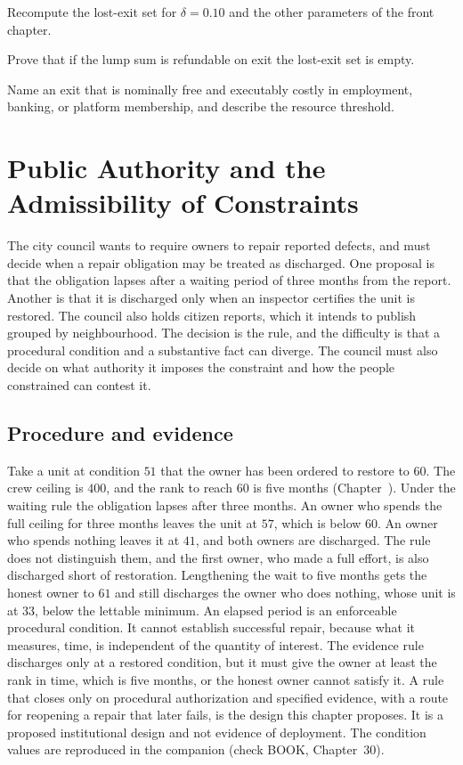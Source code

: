 \begin{exercise}
Recompute the lost-exit set for $\delta=0.10$ and the other parameters of the front chapter.
\end{exercise}
\begin{exercise}
Prove that if the lump sum is refundable on exit the lost-exit set is empty.
\end{exercise}
\begin{exercise}
Name an exit that is nominally free and executably costly in employment, banking, or platform membership, and describe the resource threshold.
\end{exercise}

\chapter{Public Authority and the Admissibility of Constraints}\label{ch:30}

The city council wants to require owners to repair reported defects, and must decide when a repair obligation may be treated as discharged. One proposal is that the obligation lapses after a waiting period of three months from the report. Another is that it is discharged only when an inspector certifies the unit is restored. The council also holds citizen reports, which it intends to publish grouped by neighbourhood. The decision is the rule, and the difficulty is that a procedural condition and a substantive fact can diverge. The council must also decide on what authority it imposes the constraint and how the people constrained can contest it.

\section{Procedure and evidence}

Take a unit at condition $51$ that the owner has been ordered to restore to $60$. The crew ceiling is $400$, and the rank to reach $60$ is five months (Chapter~). Under the waiting rule the obligation lapses after three months. An owner who spends the full ceiling for three months leaves the unit at $57$, which is below $60$. An owner who spends nothing leaves it at $41$, and both owners are discharged. The rule does not distinguish them, and the first owner, who made a full effort, is also discharged short of restoration. Lengthening the wait to five months gets the honest owner to $61$ and still discharges the owner who does nothing, whose unit is at $33$, below the lettable minimum. An elapsed period is an enforceable procedural condition. It cannot establish successful repair, because what it measures, time, is independent of the quantity of interest. The evidence rule discharges only at a restored condition, but it must give the owner at least the rank in time, which is five months, or the honest owner cannot satisfy it. A rule that closes only on procedural authorization and specified evidence, with a route for reopening a repair that later fails, is the design this chapter proposes. It is a proposed institutional design and not evidence of deployment. The condition values are reproduced in the companion (check BOOK, Chapter~30).

